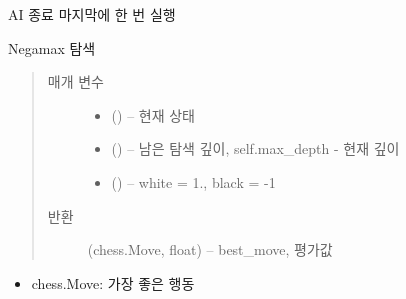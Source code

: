 \documentclass[letterpaper,10pt,english]{sphinxmanual}
\begin{document}
\begin{fulllineitems}
\begin{fulllineitems}
\begin{quote}
\begin{description}
\begin{itemize}
\end{itemize}


\end{description}\end{quote}

\end{fulllineitems}


\begin{fulllineitems}
\label{\detokenize{agents.search:agents.search.negamax_search_agent.NegamaxSearchAgent.close}}
AI 종료
마지막에 한 번 실행

\end{fulllineitems}


\begin{fulllineitems}
\label{\detokenize{agents.search:agents.search.negamax_search_agent.NegamaxSearchAgent.negamax}}
Negamax 탐색
\begin{quote}\begin{description}
\item[{매개 변수}] \leavevmode\begin{itemize}
\item {} 
 ({\hyperref[\detokenize{scripts:scripts.run_game.State}]{}}) -- 현재 상태

\item {} 
 () -- 남은 탐색 깊이, self.max\_depth - 현재 깊이

\item {} 
 () -- white = 1., black = -1

\end{itemize}

\item[{반환}] \leavevmode
(chess.Move, float) -- best\_move, 평가값

\end{description}\end{quote}
\begin{itemize}
\item {} 
chess.Move: 가장 좋은 행동


\end{itemize}
\end{fulllineitems}
\end{fulllineitems}
\end{document}
